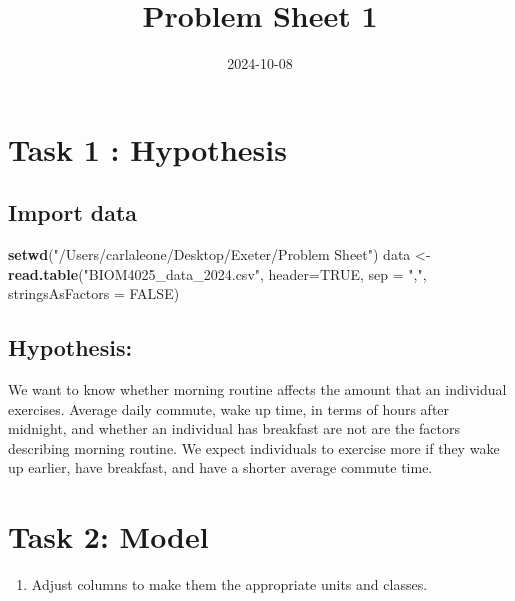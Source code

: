 \documentclass[
]{article}
\title{Problem Sheet 1}
\author{}
\date{\vspace{-2.5em}2024-10-08}
\newenvironment{Shaded}{\begin{snugshade}}{\end{snugshade}}
\newcommand{\AttributeTok}[1]{\textcolor[rgb]{0.13,0.29,0.53}{#1}}
\newcommand{\ConstantTok}[1]{\textcolor[rgb]{0.56,0.35,0.01}{#1}}
\newcommand{\FunctionTok}[1]{\textcolor[rgb]{0.13,0.29,0.53}{\textbf{#1}}}
\newcommand{\NormalTok}[1]{#1}
\newcommand{\OtherTok}[1]{\textcolor[rgb]{0.56,0.35,0.01}{#1}}
\newcommand{\StringTok}[1]{\textcolor[rgb]{0.31,0.60,0.02}{#1}}
\providecommand{\tightlist}{%
  \setlength{\itemsep}{0pt}\setlength{\parskip}{0pt}}
\begin{document}
\maketitle

\section{Task 1 : Hypothesis}\label{task-1-hypothesis}

\subsection{Import data}\label{import-data}

\begin{Shaded}
\begin{Highlighting}[]
\FunctionTok{setwd}\NormalTok{(}\StringTok{"/Users/carlaleone/Desktop/Exeter/Problem Sheet"}\NormalTok{)}
\NormalTok{data }\OtherTok{\textless{}{-}} \FunctionTok{read.table}\NormalTok{(}\StringTok{"BIOM4025\_data\_2024.csv"}\NormalTok{, }\AttributeTok{header=}\ConstantTok{TRUE}\NormalTok{, }\AttributeTok{sep =} \StringTok{","}\NormalTok{, }
                      \AttributeTok{stringsAsFactors =} \ConstantTok{FALSE}\NormalTok{)}
\end{Highlighting}
\end{Shaded}

\subsection{Hypothesis:}\label{hypothesis}

We want to know whether morning routine affects the amount that an
individual exercises. Average daily commute, wake up time, in terms of
hours after midnight, and whether an individual has breakfast are not
are the factors describing morning routine. We expect individuals to
exercise more if they wake up earlier, have breakfast, and have a
shorter average commute time.

\section{Task 2: Model}\label{task-2-model}

\begin{enumerate}
\def\labelenumi{\arabic{enumi}.}
\tightlist
\item
  Adjust columns to make them the appropriate units and classes.
\end{enumerate}
\end{document}
